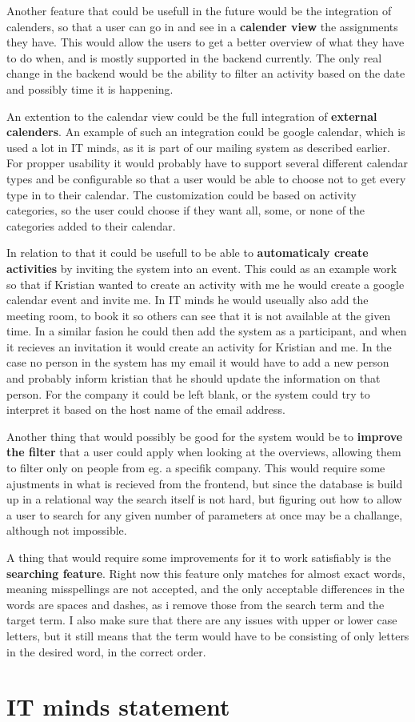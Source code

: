 Another feature that could be usefull in the future would be the integration of
calenders, so that a user can go in and see in a \textbf{calender view} the assignments
they have. This would allow the users to get a better overview of what they have
to do when, and is mostly supported in the backend currently. The only real
change in the backend would be the ability to filter an activity based on the
date and possibly time it is happening.

An extention to the calendar view could be the full integration of \textbf{external
calenders}. An example of such an integration could be google calendar, which is
used a lot in IT minds, as it is part of our mailing system as described
earlier. For propper usability it would probably have to support several
different calendar types and be configurable so that a user would be able to
choose not to get every type in to their calendar. The customization could be
based on activity categories, so the user could choose if they want all, some,
or none of the categories added to their calendar.

In relation to that it could be usefull to be able to \textbf{automaticaly create
activities} by inviting the system into an event. This could as an example work
so that if Kristian wanted to create an activity with me he would create a
google calendar event and invite me. In IT minds he would useually also add the
meeting room, to book it so others can see that it is not available at the given
time. In a similar fasion he could then add the system as a participant, and
when it recieves an invitation it would create an activity for Kristian and me.
In the case no person in the system has my email it would have to add a new
person and probably inform kristian that he should update the information on
that person. For the company it could be left blank, or the system could try to
interpret it based on the host name of the email address.

Another thing that would possibly be good for the system would  be to \textbf{improve
the filter} that a user could apply when looking at the overviews, allowing them
to filter only on people from eg. a specifik company. This would require some
ajustments in what is recieved from the frontend, but since the database is
build up in a relational way the search itself is not hard, but figuring out how
to allow a user to search for any given number of parameters at once may be a
challange, although not impossible.

A thing that would require some improvements for it to work satisfiably is the
\textbf{searching feature}. Right now this feature only matches for almost exact words,
meaning misspellings are not accepted, and the only acceptable differences in
the words are spaces and dashes, as i remove those from the search term and the
target term. I also make sure that there are any issues with upper or lower case
letters, but it still means that the term would have to be consisting of only
letters in the desired word, in the correct order.

\section{IT minds statement}
